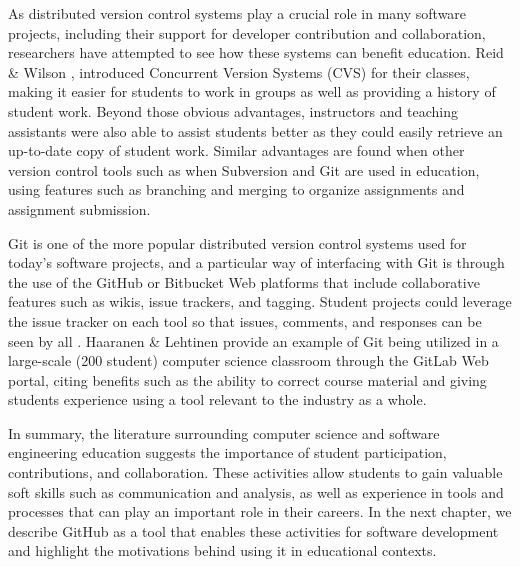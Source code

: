 As distributed version control systems play a crucial role in many software projects, including their support for developer contribution and collaboration, researchers have attempted to see how these systems can benefit education. Reid \& Wilson \cite{reid2005learning}, introduced Concurrent Version Systems (CVS) for their classes, making it easier for students to work in groups as well as providing a history of student work. Beyond those obvious advantages, instructors and teaching assistants were also able to assist students better as they could easily retrieve an up-to-date copy of student work. Similar advantages are found when other version control tools such as when Subversion \cite{clifton2007subverting} and Git \cite{griffin2013github} are used in education, using features such as branching and merging to organize assignments and assignment submission.

Git is one of the more popular distributed version control systems used for today's software projects, and a particular way of interfacing with Git is through the use of the GitHub or Bitbucket Web platforms that include collaborative features such as wikis, issue trackers, and tagging. Student projects could leverage the issue tracker on each tool so that issues, comments, and responses can be seen by all \cite{kelleher2014employing}. Haaranen \& Lehtinen \cite{haaranen2015teaching} provide an example of Git being utilized in a large-scale (200 student) computer science classroom through the GitLab Web portal, citing benefits such as the ability to correct course material and giving students experience using a tool relevant to the industry as a whole.

In summary, the literature surrounding computer science and software engineering education suggests the importance of student participation, contributions, and collaboration. These activities allow students to gain valuable soft skills such as communication and analysis, as well as experience in tools and processes that  can play an important role in their careers. In the next chapter, we describe GitHub as a tool that enables these activities for software development and highlight the motivations behind using it in educational contexts.




